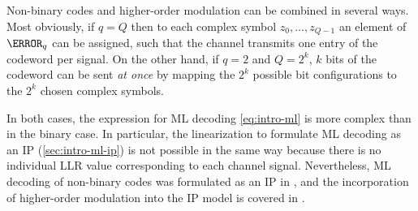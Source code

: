 Non-binary codes and higher-order modulation can be combined in several ways. Most obviously, if $q=Q$ then to each complex symbol $z_0,\dotsc,z_{Q-1}$ an element of $\F_q$ can be assigned, such that the channel transmits one entry of the codeword per signal. On the other hand, if \eg $q=2$ and $Q=2^k$, $k$ bits of the codeword can be sent \emph{at once} by mapping the $2^k$ possible bit configurations to the $2^k$ chosen complex symbols.

In both cases, the expression for ML decoding \cref{eq:intro-ml} is more complex than in the binary case. In particular, the linearization to formulate ML decoding as an IP (\cref{sec:intro-ml-ip}) is not possible in the same way because there is no individual LLR value corresponding to each channel signal. Nevertheless, ML decoding of non-binary codes was formulated as an IP in \cite{Flanagan+09NonBinary}, and the incorporation of higher-order modulation into the IP model is covered in \cite{Scholl+12MLvsBP}.